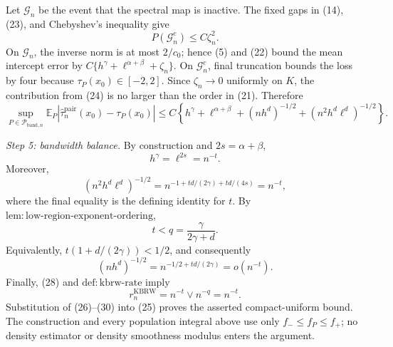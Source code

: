 Let \(\mathcal G_n\) be the event that the spectral map is inactive.  The fixed gaps in (14), (23), and Chebyshev's inequality give
\[
P(\mathcal G_n^c)\leq C\zeta_n^2.
\tag{24}
\]
On \(\mathcal G_n\), the inverse norm is at most \(2/c_0\); hence (5) and (22) bound the mean intercept error by \(C\{h^\gamma+\ell^{\alpha+\beta}+\zeta_n\}\).  On \(\mathcal G_n^c\), final truncation bounds the loss by four because \(\tau_P(x_0)\in[-2,2]\).  Since \(\zeta_n\to0\) uniformly on \(K\), the contribution from (24) is no larger than the order in (21).  Therefore
\[
\sup_{P\in\mathcal P_{\mathrm{band},n}}
\mathbb E_P\left|
\widehat\tau_n^{\mathrm{pair}}(x_0)-\tau_P(x_0)
\right|
\leq C\left\{
h^\gamma+\ell^{\alpha+\beta}
+(nh^d)^{-1/2}+(n^2h^d\ell^d)^{-1/2}
\right\}.
\tag{25}
\]

\emph{Step 5: bandwidth balance.}
By construction and \(2s=\alpha+\beta\),
\[
h^\gamma=\ell^{2s}=n^{-t}.
\tag{26}
\]
Moreover,
\[
(n^2h^d\ell^d)^{-1/2}
=n^{-1+td/(2\gamma)+td/(4s)}=n^{-t},
\tag{27}
\]
where the final equality is the defining identity for \(t\).  By \(\mathrm{lem:low\mbox{-}region\mbox{-}exponent\mbox{-}ordering}\),
\[
t<q=\frac\gamma{2\gamma+d}.
\tag{28}
\]
Equivalently, \(t(1+d/(2\gamma))<1/2\), and consequently
\[
(nh^d)^{-1/2}
=n^{-1/2+td/(2\gamma)}=o(n^{-t}).
\tag{29}
\]
Finally, (28) and \(\mathrm{def:kbrw\mbox{-}rate}\) imply
\[
r_n^{\mathrm{KBRW}}=n^{-t}\vee n^{-q}=n^{-t}.
\tag{30}
\]
Substitution of (26)--(30) into (25) proves the asserted compact-uniform bound.  The construction and every population integral above use only \(f_-\leq f_P\leq f_+\); no density estimator or density smoothness modulus enters the argument.